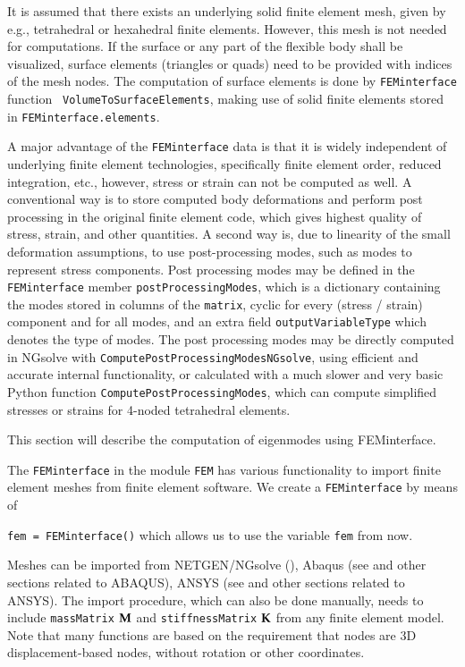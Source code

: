 It is assumed that there exists an underlying solid finite element mesh, given by e.g., tetrahedral or hexahedral finite elements. However, this mesh is not needed for computations. If the surface or any part of the flexible body shall be visualized, surface elements (triangles or quads) need to be provided with indices of the mesh nodes. The computation of surface elements is done by \texttt{FEMinterface} function \texttt{ VolumeToSurfaceElements}, making use of solid finite elements stored in \texttt{FEMinterface.elements}.

A major advantage of the \texttt{FEMinterface} data is that it is widely independent of underlying finite element technologies, specifically finite element order, reduced integration, etc., however, stress or strain can not be computed as well.
A conventional way is to store computed body deformations and perform post processing in the original finite element code, which gives highest quality of stress, strain, and other quantities.
A second way is, due to linearity of the small deformation assumptions, to use post-processing modes, such as modes to represent stress components. 
Post processing modes may be defined in the \texttt{FEMinterface} member \texttt{postProcessingModes}, which is a dictionary containing the modes stored in columns of the \texttt{matrix}, cyclic for every (stress / strain) component and for all modes, and an extra field \texttt{outputVariableType} which denotes the type of modes.
The post processing modes may be directly computed in NGsolve with \texttt{ComputePostProcessingModesNGsolve}, using efficient and accurate internal functionality, or calculated with a much slower and very basic Python function \texttt{ComputePostProcessingModes}, which can compute simplified stresses or strains for 4-noded tetrahedral elements. 


This section will describe the computation of eigenmodes using FEMinterface.

The \texttt{FEMinterface} in the module \texttt{FEM} has various functionality to import finite element meshes from finite element software.
We create a \texttt{FEMinterface} by means of
\bi
  \item[] \texttt{fem = FEMinterface()}
\ei
which allows us to use the variable \texttt{fem} from now.

Meshes can be imported from NETGEN/NGsolve (), Abaqus (see  and other sections related to ABAQUS), ANSYS (see  and other sections related to ANSYS).
The import procedure, which can also be done manually, needs to include \texttt{massMatrix} $\mathbf{M}$ and \texttt{stiffnessMatrix} $\mathbf{K}$ from any finite element model.
Note that many functions are based on the requirement that nodes are 3D displacement-based nodes, without rotation or other coordinates.

